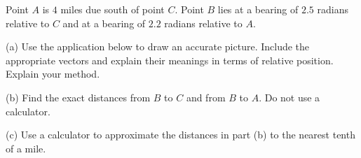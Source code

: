 \documentclass{ximera}
\begin{document}
\begin{question}  \label{Qwereduy764}
Point $A$ is $4$ miles due south of point $C$. Point $B$ lies at a bearing of $2.5$ radians relative to $C$ and at a bearing of $2.2$ radians relative to $A$.

(a) Use the application below to draw an accurate picture. Include the appropriate vectors and explain their meanings in terms of relative position. Explain your method.

(b) Find the exact distances from $B$ to $C$ and from $B$ to $A$. Do not use a calculator.

(c) Use a calculator to approximate the distances in part (b) to the nearest tenth of a mile.

 
\begin{onlineOnly}
    \begin{center}
\end{center}
\end{onlineOnly}
\end{question}
\end{document}
